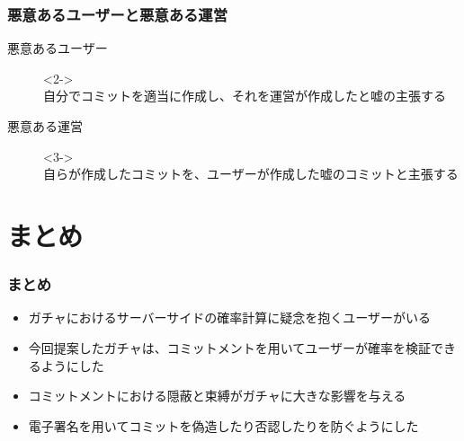 \begin{frame}
  \frametitle{悪意あるユーザーと悪意ある運営}
  
  \begin{description}
    \item[悪意あるユーザー]<2->\mbox{}\\
      自分でコミットを適当に作成し、それを運営が作成したと嘘の主張する
    \item[悪意ある運営]<3->\mbox{}\\
      自らが作成したコミットを、ユーザーが作成した嘘のコミットと主張する
  \end{description}

  \begin{center}


  \end{center}
\end{frame}

\section{まとめ}
\begin{frame}
  \frametitle{まとめ}
  
  \begin{itemize}
    \item<2-> ガチャにおけるサーバーサイドの確率計算に疑念を抱くユーザーがいる
    \item<3-> 今回提案したガチャは、コミットメントを用いてユーザーが確率を検証できるようにした
    \item<4-> コミットメントにおける隠蔽と束縛がガチャに大きな影響を与える
    \item<5-> 電子署名を用いてコミットを偽造したり否認したりを防ぐようにした
  \end{itemize}
\end{frame}

